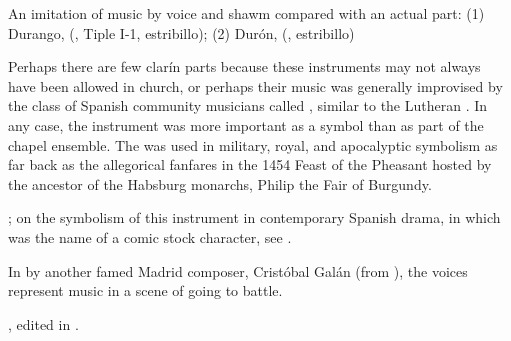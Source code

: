 \begin{musicexample}
    \label{mux:durango-duron-clarines}
    \caption{An imitation of  music by voice and shawm compared
    with an actual  part: 
    (1) Durango,  (, Tiple I-1,
    estribillo); 
    (2) Durón,  (, estribillo)}

\end{musicexample}

Perhaps there are few clarín parts because these instruments may not always
have been allowed in church, or perhaps their music was generally improvised by
the class of Spanish community musicians called , similar to 
the Lutheran .%
In any case, the instrument was more important as a symbol than as part of the
chapel ensemble.
The  was used in military, royal, and apocalyptic symbolism as far
back as the allegorical  fanfares in the 1454 Feast of the
Pheasant hosted by the ancestor of the Habsburg monarchs, Philip the Fair of
Burgundy.%
\begin{Footnote}
    \Autocites[340--380]{LaMarche:Memoires}{Bloxam:JNV}{Perkins:Patronage15C};
    on the symbolism of this instrument in contemporary Spanish drama, in which
     was the name of a comic stock character, see
    \autocite{Damjanovic:Clarin}.
\end{Footnote}
In  by another famed Madrid composer, Cristóbal
Galán (from ), the voices represent  music in a scene
of  going to battle.%
\begin{Footnote} 
    , 
    edited in \autocite[555--565]{CaberoPueyo:PhD}.
\end{Footnote}


